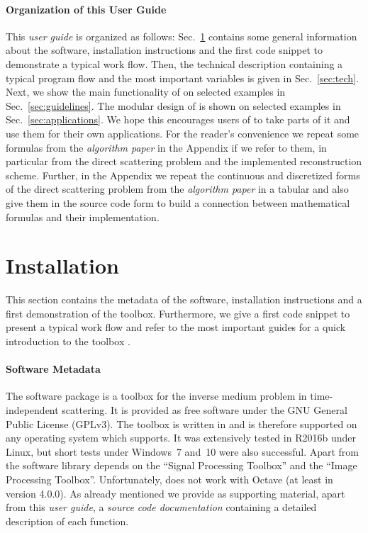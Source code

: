\documentclass[a4paper]{article}
\begin{document}
\paragraph{Organization of this User Guide} This \emph{user guide} is organized as follows: 
Sec.~\ref{sec:installation} contains some general information about the software, installation instructions and the first code snippet to demonstrate a typical work flow. 
Then, the technical description containing a typical program flow and the most important variables is given in Sec.~\ref{sec:tech}. 
Next, we show the main functionality of \IPscatt on selected examples in Sec.~\ref{sec:guidelines}. 
The modular design of \IPscatt is shown on selected examples in Sec.~\ref{sec:applications}. We hope this encourages users of \IPscatt to take parts of it and use them for their own applications. 
For the reader's convenience we repeat some formulas from the \emph{algorithm paper} in the Appendix if we refer to them, in particular from the direct scattering problem and the implemented reconstruction scheme. 
Further, in the Appendix we repeat the continuous and discretized forms of the direct scattering problem from the \emph{algorithm paper} in a tabular and also give them in the source code form to build a connection between mathematical formulas and their implementation.


\section{Installation}\label{sec:installation}

This section contains the metadata of the software, installation instructions and a first demonstration of the toolbox. Furthermore, we give a first code snippet to present a typical work flow and refer to the most important guides for a quick introduction to the toolbox \IPscatt.

\paragraph{Software Metadata} The software package \IPscatt is a \MATLAB toolbox for the inverse medium problem in time-independent scattering. It is provided as free software under the GNU General Public License (GPLv3). 
The toolbox is written in \MATLAB and is therefore supported on any operating system which \MATLAB supports. It was extensively tested in \MATLAB R2016b under Linux, but short tests under Windows~7 and~10 were also successful. Apart from \MATLAB the software library \IPscatt depends on the ``Signal Processing Toolbox'' and the ``Image Processing Toolbox''. Unfortunately, \IPscatt does not work with Octave (at least in version 4.0.0). 
As already mentioned we provide as supporting material, apart from this \emph{user guide}, a \emph{source code documentation} containing a detailed description of each function.
\end{document}
